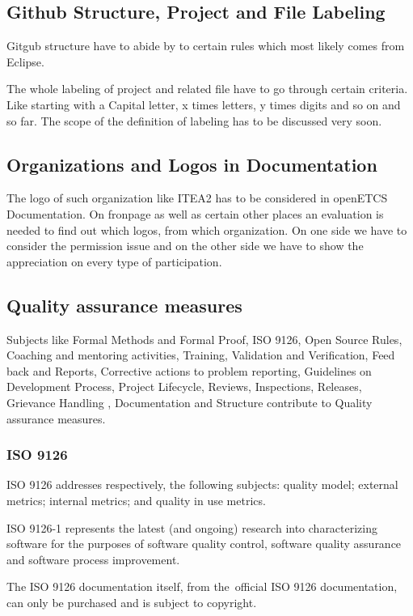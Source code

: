 \documentclass{template/openetcs_article}
\begin{document}
\subsection{Github Structure, Project and File Labeling}
Gitgub structure have to abide by to certain rules which most likely comes from Eclipse.

The whole labeling of project and related file have to go through certain criteria. Like starting with a Capital letter, x times letters, y times digits and so on and so far. The scope of the definition of labeling has to be discussed very soon.


\subsection{Organizations and Logos in Documentation}
The logo of such organization like ITEA2 has to be considered in openETCS Documentation. On fronpage as well as certain other places an evaluation is needed to find out which logos, from which organization. On one side we have to consider the permission issue and on the other side we have to show the appreciation on every type of participation. 



\subsection{Quality assurance measures}
Subjects like Formal Methods and Formal Proof, ISO 9126, Open Source Rules, Coaching and mentoring activities, Training,  Validation and Verification, Feed back and Reports, Corrective actions to problem reporting, Guidelines on Development Process, Project Lifecycle, Reviews, Inspections, Releases, Grievance Handling , Documentation and Structure contribute to Quality assurance measures.


\subsubsection{ISO 9126}
ISO 9126 addresses respectively, the following subjects: quality model; external metrics; internal metrics; and quality in use metrics. 

ISO 9126-1 represents the latest (and ongoing) research into characterizing software for the purposes of software quality control, software quality assurance and software process improvement.

The ISO 9126 documentation itself, from the~official ISO 9126 documentation, can only be purchased and is subject to copyright.
\end{document}
